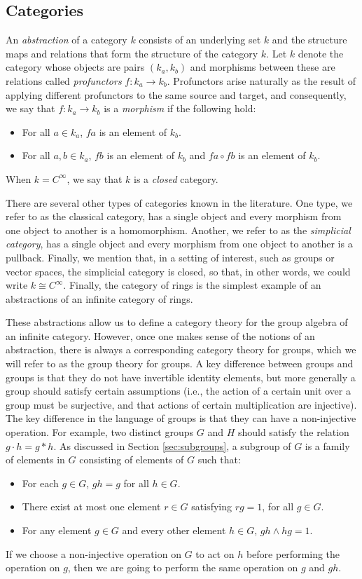 \documentclass[a4paper,reqno,oneside]{article}
\begin{document}
\subsection{Categories}
An \emph{abstraction} of a category $k$ consists of an underlying set $k$ and the structure maps and relations that form the structure of the category $k$. Let $k$ denote the category whose objects are pairs $(k_a, k_b)$ and morphisms between these are relations called \emph{profunctors} $f: k_a \to k_b$. Profunctors arise naturally as the result of applying different profunctors to the same source and target, and consequently, we say that $f: k_a \to k_b$ is a \emph{morphism} if the following hold: 
\begin{itemize}
\item For all $a \in k_a$, $fa$ is an element of $k_b$.
\item For all $a, b \in k_a$, $fb$ is an element of $k_b$ and $fa \circ fb$ is an element of $k_b$.
\end{itemize}
When $k = C^\infty$, we say that $k$ is a \emph{closed} category.

There are several other types of categories known in the literature.  One type, we refer to as the classical category, has a single object and every morphism from one object to another is a homomorphism. Another, we refer to as the \emph{simplicial category}, has a single object and every morphism from one object to another is a pullback. Finally, we mention that, in a setting of interest, such as groups or vector spaces, the simplicial category is closed, so that, in other words, we could write $k \cong C^\infty$.   Finally, the category of rings is the simplest example of an abstractions of an infinite category of rings. 

These abstractions allow us to define a category theory for the group algebra of an infinite category. However, once one makes sense of the notions of an abstraction, there is always a corresponding category theory for groups, which we will refer to as the group theory for groups.  A key difference between groups and groups is that they do not have invertible identity elements, but more generally a group should satisfy certain assumptions (i.e., the action of a certain unit over a group must be surjective, and that actions of certain multiplication are injective).  The key difference in the language of groups is that they can have a non-injective operation.  For example, two distinct groups $G$ and $H$ should satisfy the relation $g \cdot h = g * h$. As discussed in Section \ref{sec:subgroups}, a subgroup of $G$ is a family of elements in $G$ consisting of elements of $G$ such that:
\begin{itemize}
\item For each $g \in G$, $gh = g$ for all $h \in G$. 
\item There exist at most one element $r \in G$ satisfying $rg = 1$, for all $g \in G$. 
\item For any element $g \in G$ and every other element $h \in G$, $gh \wedge hg = 1$. 
\end{itemize}
If we choose a non-injective operation on $G$ to act on $h$ before performing the operation on $g$, then we are going to perform the same operation on $g$ and $gh$.
\end{document}
